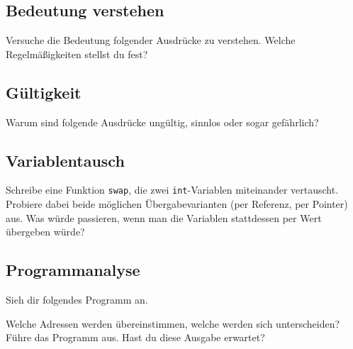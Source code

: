 
\subsection{Bedeutung verstehen}
Versuche die Bedeutung folgender Ausdrücke zu verstehen.
Welche Regelmäßigkeiten stellst du fest?



\subsection{Gültigkeit}
Warum sind folgende Ausdrücke ungültig, sinnlos oder sogar gefährlich?



\subsection{Variablentausch}
Schreibe eine Funktion \lstinline{swap}, die zwei \lstinline{int}-Variablen miteinander vertauscht.
Probiere dabei beide möglichen Übergabevarianten (per Referenz, per Pointer) aus.
Was würde passieren, wenn man die Variablen stattdessen per Wert übergeben würde?

\subsection{Programmanalyse}
Sieh dir folgendes Programm an.


Welche Adressen werden übereinstimmen, welche werden sich unterscheiden?
Führe das Programm aus.
Hast du diese Ausgabe erwartet?

